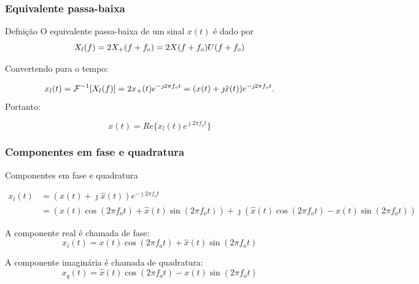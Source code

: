 \documentclass[10pt,hyperref={pdfpagemode=FullScreen},aspectratio=169]{beamer}
\begin{document}
\begin{frame}
  \frametitle{Equivalente passa-baixa}

  \begin{block}{Defnição
    }
    O equivalente passa-baixa de um sinal $x(t)$ é dado por
    $$
    X_l(f) = 2X_+(f+f_o) \newline
    = 2X(f+f_o) U(f + f_o)
$$
  \end{block}




Convertendo para o tempo:

$$
  x_l(t) =\mathcal{F}^{-1}[X_l(f)] \newline
         = 2x_+(t)e^{-\jmath 2 \pi f_o t} \newline
         = (x(t) + \jmath \hat {x}(t))e^{-\jmath 2 \pi f_o t}.
$$
Portanto:

$$
  x(t) = Re\{ x_l(t)e^{\jmath 2 \pi f_o t}\}
$$


\end{frame}


\begin{frame}
  \frametitle{Componentes em fase e quadratura}

  Componentes em fase e quadratura


\begin{align*}
   x_l(t) &= (x(t) + \jmath \hat {x}(t))e^{-\jmath 2 \pi f_o t} \\
          &= (x(t)\cos(2\pi f_o t) + \hat {x}(t)\sin(2 \pi f_o t) ) + \jmath (\hat {x}(t)\cos(2\pi f_o t) - x(t)\sin(2 \pi f_o t) )
\end{align*}

A componente real é chamada de fase:
$$
   x_i(t) = x(t)\cos(2\pi f_o t) + \hat {x}(t)\sin(2 \pi f_o t)
$$

A componente imaginária é chamada de quadratura:
$$
  x_q(t) = \hat {x}(t)\cos(2\pi f_o t) - x(t)\sin(2 \pi f_o t)
$$

\end{frame}
\end{document}
